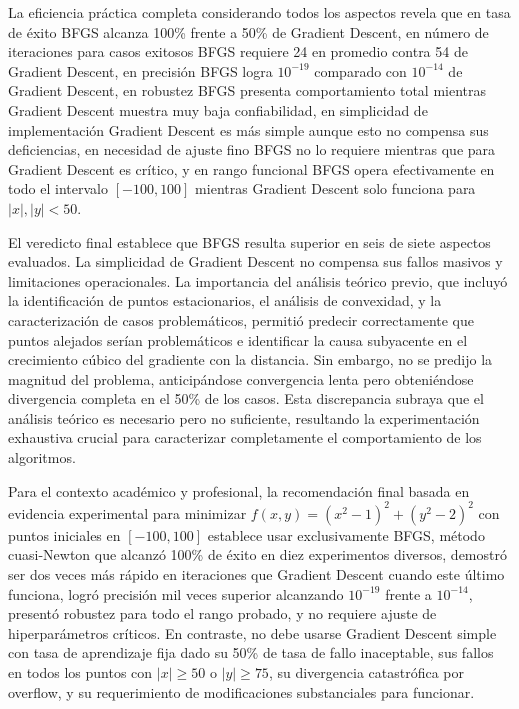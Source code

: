 \documentclass[12pt,a4paper]{article}
\begin{document}
La eficiencia práctica completa considerando todos los aspectos revela que en tasa de éxito BFGS alcanza 100\% frente a 50\% de Gradient Descent, en número de iteraciones para casos exitosos BFGS requiere 24 en promedio contra 54 de Gradient Descent, en precisión BFGS logra $10^{-19}$ comparado con $10^{-14}$ de Gradient Descent, en robustez BFGS presenta comportamiento total mientras Gradient Descent muestra muy baja confiabilidad, en simplicidad de implementación Gradient Descent es más simple aunque esto no compensa sus deficiencias, en necesidad de ajuste fino BFGS no lo requiere mientras que para Gradient Descent es crítico, y en rango funcional BFGS opera efectivamente en todo el intervalo $[-100,100]$ mientras Gradient Descent solo funciona para $|x|, |y| < 50$.

El veredicto final establece que BFGS resulta superior en seis de siete aspectos evaluados. La simplicidad de Gradient Descent no compensa sus fallos masivos y limitaciones operacionales. La importancia del análisis teórico previo, que incluyó la identificación de puntos estacionarios, el análisis de convexidad, y la caracterización de casos problemáticos, permitió predecir correctamente que puntos alejados serían problemáticos e identificar la causa subyacente en el crecimiento cúbico del gradiente con la distancia. Sin embargo, no se predijo la magnitud del problema, anticipándose convergencia lenta pero obteniéndose divergencia completa en el 50\% de los casos. Esta discrepancia subraya que el análisis teórico es necesario pero no suficiente, resultando la experimentación exhaustiva crucial para caracterizar completamente el comportamiento de los algoritmos.

Para el contexto académico y profesional, la recomendación final basada en evidencia experimental para minimizar $f(x,y) = (x^2-1)^2 + (y^2-2)^2$ con puntos iniciales en $[-100, 100]$ establece usar exclusivamente BFGS, método cuasi-Newton que alcanzó 100\% de éxito en diez experimentos diversos, demostró ser dos veces más rápido en iteraciones que Gradient Descent cuando este último funciona, logró precisión mil veces superior alcanzando $10^{-19}$ frente a $10^{-14}$, presentó robustez para todo el rango probado, y no requiere ajuste de hiperparámetros críticos. En contraste, no debe usarse Gradient Descent simple con tasa de aprendizaje fija dado su 50\% de tasa de fallo inaceptable, sus fallos en todos los puntos con $|x| \geq 50$ o $|y| \geq 75$, su divergencia catastrófica por overflow, y su requerimiento de modificaciones substanciales para funcionar.
\end{document}
